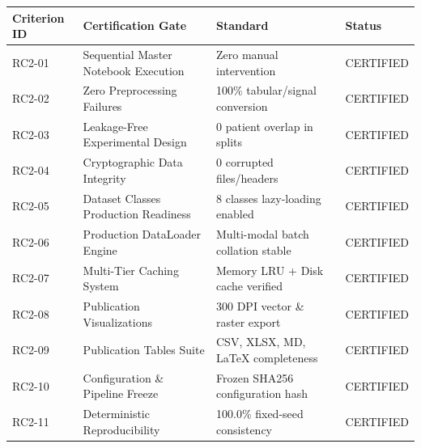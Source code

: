 \begin{tabular}{llll}
\toprule
Criterion ID & Certification Gate & Standard & Status \\
\midrule
RC2-01 & Sequential Master Notebook Execution & Zero manual intervention & CERTIFIED \\
RC2-02 & Zero Preprocessing Failures & 100\% tabular/signal conversion & CERTIFIED \\
RC2-03 & Leakage-Free Experimental Design & 0 patient overlap in splits & CERTIFIED \\
RC2-04 & Cryptographic Data Integrity & 0 corrupted files/headers & CERTIFIED \\
RC2-05 & Dataset Classes Production Readiness & 8 classes lazy-loading enabled & CERTIFIED \\
RC2-06 & Production DataLoader Engine & Multi-modal batch collation stable & CERTIFIED \\
RC2-07 & Multi-Tier Caching System & Memory LRU + Disk cache verified & CERTIFIED \\
RC2-08 & Publication Visualizations & 300 DPI vector \& raster export & CERTIFIED \\
RC2-09 & Publication Tables Suite & CSV, XLSX, MD, LaTeX completeness & CERTIFIED \\
RC2-10 & Configuration \& Pipeline Freeze & Frozen SHA256 configuration hash & CERTIFIED \\
RC2-11 & Deterministic Reproducibility & 100.0\% fixed-seed consistency & CERTIFIED \\
\bottomrule
\end{tabular}
